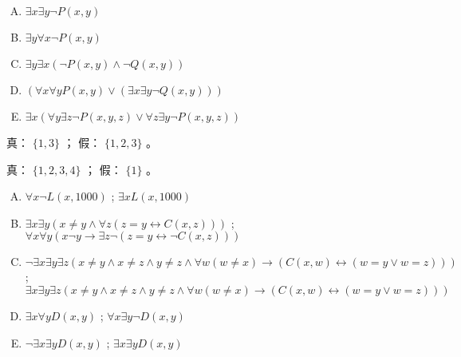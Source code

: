 {{        %
        \begin{practices}
            \begin{enumerate}[A.]
                \item $\exists x \exists y \neg P(x, y)$
                \item $\exists y \forall x \neg P(x, y)$
                \item $\exists y \exists x (\neg P(x, y) \wedge \neg Q(x, y))$
                \item $(\forall x \forall y P(x, y) \vee (\exists x \exists y \neg Q(x, y)))$
                \item $\exists x (\forall y \exists z \neg P(x, y, z) \vee \forall z \exists y \neg P(x, y, z))$
            \end{enumerate}
        \end{practices}

        \begin{practices}
            真： $\{1, 3\}$ ；
            假： $\{1, 2, 3\}$ 。
        \end{practices}

        \begin{practices}
            真： $\{1, 2, 3, 4\}$ ；
            假： $\{1\}$ 。
        \end{practices}

        \begin{practices}
            \begin{enumerate}[A.]
                \item $\forall x \neg L(x, 1000)$ ; $\exists x L(x, 1000)$
                \item $\exists x \exists y (x \neq y \wedge \forall z (z = y \leftrightarrow C(x, z)))$ ; $\forall x \forall y (x \neg y \rightarrow \exists z \neg (z = y \leftrightarrow \neg C(x, z)))$
                \item $\neg \exists x \exists y \exists z (x \neq y \wedge x \neq z \wedge y \neq z \wedge \forall w (w \neq x) \rightarrow (C(x, w) \leftrightarrow (w = y \vee w = z)))$ ; $\exists x \exists y \exists z (x \neq y \wedge x \neq z \wedge y \neq z \wedge \forall w (w \neq x) \rightarrow (C(x, w) \leftrightarrow (w = y \vee w = z)))$
                \item $\exists x \forall y D(x, y)$ ; $\forall x \exists y \neg D(x, y)$
                \item $\neg \exists x \exists y D(x, y)$ ; $\exists x \exists y D(x, y)$
            \end{enumerate}
        \end{practices}

}}

